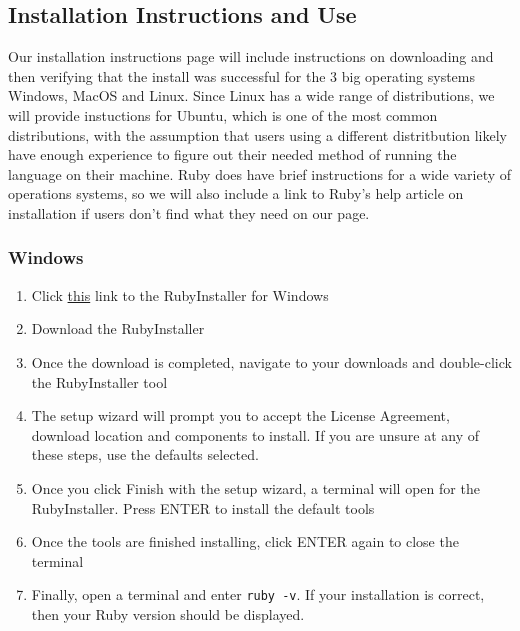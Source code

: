 \documentclass{article}
\begin{document}
\subsection{Installation Instructions and Use}
  Our installation instructions page will include instructions on downloading and then verifying that the install was successful for the 3 big operating systems Windows, MacOS and Linux.
  Since Linux has a wide range of distributions, we will provide instuctions for Ubuntu, which is one of the most common distributions, with the assumption that users using a different distritbution
  likely have enough experience to figure out their needed method of running the language on their machine. Ruby does have brief instructions for a wide variety of operations systems, so we will also 
  include a link to Ruby's help article on installation if users don't find what they need on our page.
  \newline
  \newline
  \subsubsection{Windows}
    \begin{enumerate}
      \item Click \href{https://rubyinstaller.org/}{this} link to the RubyInstaller for Windows
      \item Download the RubyInstaller
      \item Once the download is completed, navigate to your downloads and double-click the RubyInstaller tool
      \item The setup wizard will prompt you to accept the License Agreement, download location and components to install. If you are unsure at any of these steps, use the defaults selected.
      \item Once you click Finish with the setup wizard, a terminal will open for the RubyInstaller. Press ENTER to install the default tools
      \item Once the tools are finished installing, click ENTER again to close the terminal
      \item Finally, open a terminal and enter \verb|ruby -v|. If your installation is correct, then your Ruby version should be displayed.
    \end{enumerate}
\end{document}
